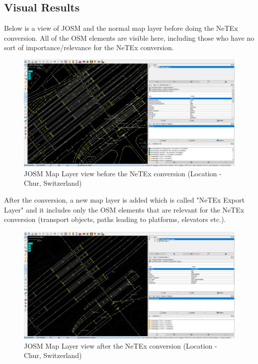 \subsection{Visual Results}
Below is a view of JOSM and the normal map layer before doing the NeTEx conversion. All of the OSM elements are visible here, including those who have no sort of importance/relevance for the NeTEx conversion.
\begin{figure}[H]
	\includegraphics[width=\linewidth]{./Images/Results/visual_result_before_export.png}
	\caption{JOSM Map Layer view before the NeTEx conversion (Location - Chur, Switzerland)}
\end{figure}
After the conversion, a new map layer is added which is called "NeTEx Export Layer" and it includes only the OSM elements that are relevant for the NeTEx conversion (transport objects, paths leading to platforms, elevators etc.).
\begin{figure}[H]
	\includegraphics[width=\linewidth]{./Images/Results/visual_result_after_export.png}
	\caption{JOSM Map Layer view after the NeTEx conversion (Location - Chur, Switzerland)}
\end{figure}
